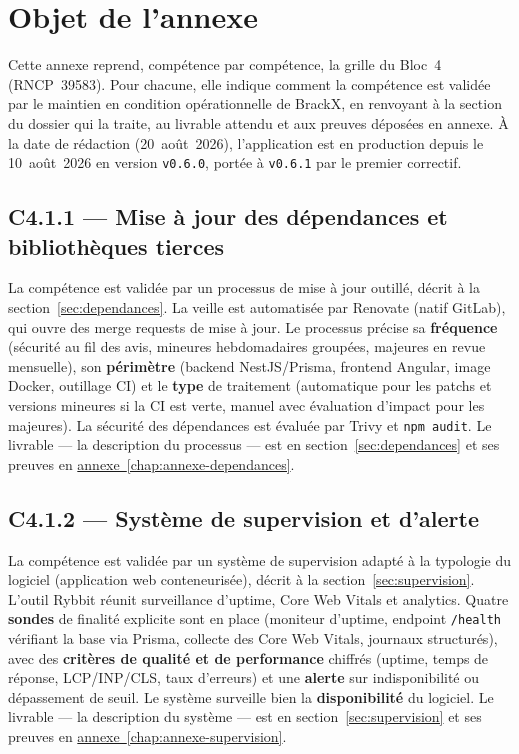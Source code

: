 \section*{Objet de l'annexe}
Cette annexe reprend, compétence par compétence, la grille du Bloc~4 (RNCP~39583). Pour chacune, elle indique comment la compétence est validée par le maintien en condition opérationnelle de BrackX, en renvoyant à la section du dossier qui la traite, au livrable attendu et aux preuves déposées en annexe. À la date de rédaction (20~août~2026), l'application est en production depuis le 10~août~2026 en version \texttt{v0.6.0}, portée à \texttt{v0.6.1} par le premier correctif.

\subsection*{C4.1.1 --- Mise à jour des dépendances et bibliothèques tierces}
La compétence est validée par un processus de mise à jour outillé, décrit à la section~\ref*{sec:dependances}. La veille est automatisée par Renovate (natif GitLab), qui ouvre des merge requests de mise à jour. Le processus précise sa \textbf{fréquence} (sécurité au fil des avis, mineures hebdomadaires groupées, majeures en revue mensuelle), son \textbf{périmètre} (backend NestJS/Prisma, frontend Angular, image Docker, outillage CI) et le \textbf{type} de traitement (automatique pour les patchs et versions mineures si la CI est verte, manuel avec évaluation d'impact pour les majeures). La sécurité des dépendances est évaluée par Trivy et \texttt{npm audit}. Le livrable — la description du processus — est en section~\ref*{sec:dependances} et ses preuves en \hyperref[chap:annexe-dependances]{annexe~\ref*{chap:annexe-dependances}}.

\subsection*{C4.1.2 --- Système de supervision et d'alerte}
La compétence est validée par un système de supervision adapté à la typologie du logiciel (application web conteneurisée), décrit à la section~\ref*{sec:supervision}. L'outil Rybbit réunit surveillance d'uptime, Core Web Vitals et analytics. Quatre \textbf{sondes} de finalité explicite sont en place (moniteur d'uptime, endpoint \texttt{/health} vérifiant la base via Prisma, collecte des Core Web Vitals, journaux structurés), avec des \textbf{critères de qualité et de performance} chiffrés (uptime, temps de réponse, LCP/INP/CLS, taux d'erreurs) et une \textbf{alerte} sur indisponibilité ou dépassement de seuil. Le système surveille bien la \textbf{disponibilité} du logiciel. Le livrable — la description du système — est en section~\ref*{sec:supervision} et ses preuves en \hyperref[chap:annexe-supervision]{annexe~\ref*{chap:annexe-supervision}}.

